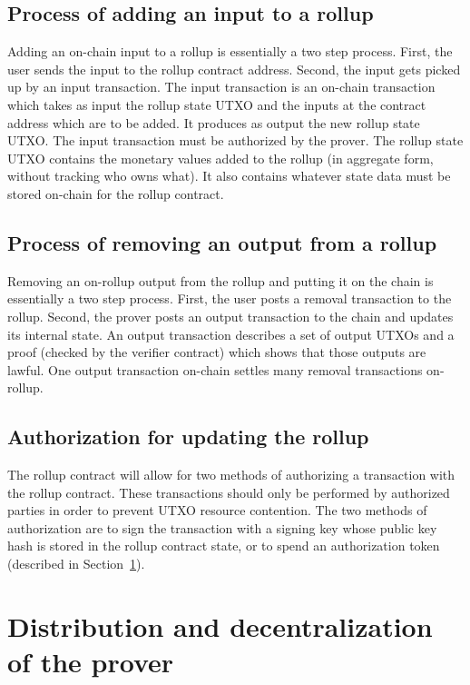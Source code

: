 \documentclass[12pt]{article}
\begin{document}
\subsection{Process of adding an input to a rollup}

Adding an on-chain input to a rollup is essentially a two step process. First, the user sends the input to the rollup contract address. Second, the input gets picked up by an input transaction. The input transaction is an on-chain transaction which takes as input the rollup state UTXO and the inputs at the contract address which are to be added. It produces as output the new rollup state UTXO. The input transaction must be authorized by the prover. The rollup state UTXO contains the monetary values added to the rollup (in aggregate form, without tracking who owns what). It also contains whatever state data must be stored on-chain for the rollup contract.


\subsection{Process of removing an output from a rollup}

Removing an on-rollup output from the rollup and putting it on the chain is essentially a two step process. First, the user posts a removal transaction to the rollup. Second, the prover posts an output transaction to the chain and updates its internal state. An output transaction describes a set of output UTXOs and a proof (checked by the verifier contract) which shows that those outputs are lawful. One output transaction on-chain settles many removal transactions on-rollup.

\subsection{Authorization for updating the rollup}

The rollup contract will allow for two methods of authorizing a transaction with the rollup contract. These transactions should only be performed by authorized parties in order to prevent UTXO resource contention. The two methods of authorization are to sign the transaction with a signing key whose public key hash is stored in the rollup contract state, or to spend an authorization token (described in Section~\ref{sec:distribution-decentralization}).


\section{Distribution and decentralization of the prover}
\label{sec:distribution-decentralization}
\end{document}
